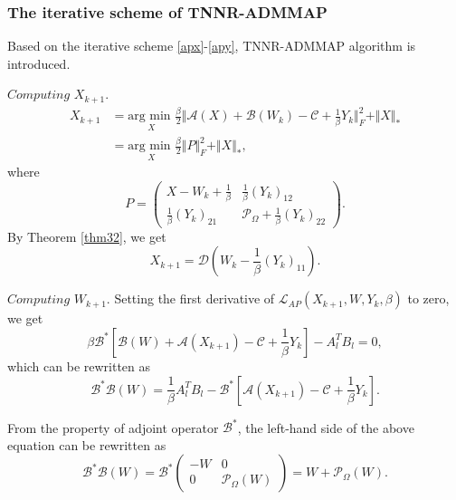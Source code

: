 \documentclass{article}
\begin{document}
{\subsubsection{The iterative scheme of TNNR-ADMMAP}
Based on the iterative scheme \eqref{apx}-\eqref{apy}, TNNR-ADMMAP algorithm is introduced.

$\textit{Computing}$  $X_{k+1}$.
\begin{equation}
	\begin{aligned}
			X_{k+1} & = \underset{X}{\text{arg min }}\frac{\beta}{2}\Vert \mathcal{A}(X) + \mathcal{B}(W_k) - \mathcal{C} + \frac{1}{\beta}Y_{k} \Vert_F^2 + \Vert X \Vert_* \\
			& = \underset{X}{\text{arg min }}\frac{\beta}{2}\Vert P \Vert^2_F + \Vert X\Vert_*,
	\end{aligned}
\end{equation}
where 
\begin{equation*}
	P = \begin{pmatrix}
		X- W_k + \frac{1}{\beta} & \frac{1}{\beta} (Y_k)_{12} \\
		\frac{1}{\beta}(Y_k)_{21} & \mathcal{P}_\Omega + \frac{1}{\beta}(Y_k)_{22}
	\end{pmatrix}.
\end{equation*}
By Theorem \eqref{thm32}, we get
\begin{equation}
	X_{k+1} = \mathcal{D}\left(W_k - \frac{1}{\beta}(Y_k)_{11}\right).
\end{equation}

$\textit{Computing}$  $W_{k+1}$. Setting the first derivative of
$\mathcal{L}_{AP}(X_{k+1},W,Y_k,\beta)$ to zero, we get
\begin{equation*}
	\beta \mathcal{B}^*\left[ \mathcal{B}(W) + \mathcal{A} (X_{k+1} ) - \mathcal{C} +\frac{1}{\beta} Y_k \right] - A_l^TB_l = 0,
\end{equation*}
which can be rewritten as
\begin{equation}
	\mathcal{B}^*\mathcal{B}(W) = \frac{1}{\beta}A_l^TB_l - \mathcal{B}^*\left[ \mathcal{A} (X_{k+1} ) - \mathcal{C} +\frac{1}{\beta} Y_k \right].
\end{equation}

From the property of adjoint operator $\mathcal{B}^*$, the left-hand side of the above equation can be rewritten as
\begin{equation}
	\label{w1}
	\mathcal{B}^*\mathcal{B}(W) = \mathcal{B}^* \begin{pmatrix}
		-W & 0 \\
		0 & \mathcal{P}_\Omega(W)
	\end{pmatrix} = W + \mathcal{P}_\Omega(W).
\end{equation}

}
\end{document}
